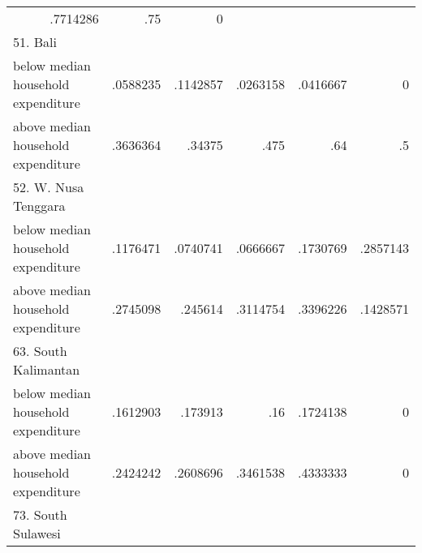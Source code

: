 \begin{table}[!h]
\begin{tabular}{llllll}
  \multicolumn{1}{r}{.7714286} &
  \multicolumn{1}{r}{.75} &
  \multicolumn{1}{r}{0} \\
\multicolumn{1}{l}{51. Bali} &
  \multicolumn{1}{|r}{} &
  \multicolumn{1}{r}{} &
  \multicolumn{1}{r}{} &
  \multicolumn{1}{r}{} &
  \multicolumn{1}{r}{} \\
\multicolumn{1}{l}{\hspace{1em}below median household expenditure} &
  \multicolumn{1}{|r}{.0588235} &
  \multicolumn{1}{r}{.1142857} &
  \multicolumn{1}{r}{.0263158} &
  \multicolumn{1}{r}{.0416667} &
  \multicolumn{1}{r}{0} \\
\multicolumn{1}{l}{\hspace{1em}above median household expenditure} &
  \multicolumn{1}{|r}{.3636364} &
  \multicolumn{1}{r}{.34375} &
  \multicolumn{1}{r}{.475} &
  \multicolumn{1}{r}{.64} &
  \multicolumn{1}{r}{.5} \\
\multicolumn{1}{l}{52. W. Nusa Tenggara} &
  \multicolumn{1}{|r}{} &
  \multicolumn{1}{r}{} &
  \multicolumn{1}{r}{} &
  \multicolumn{1}{r}{} &
  \multicolumn{1}{r}{} \\
\multicolumn{1}{l}{\hspace{1em}below median household expenditure} &
  \multicolumn{1}{|r}{.1176471} &
  \multicolumn{1}{r}{.0740741} &
  \multicolumn{1}{r}{.0666667} &
  \multicolumn{1}{r}{.1730769} &
  \multicolumn{1}{r}{.2857143} \\
\multicolumn{1}{l}{\hspace{1em}above median household expenditure} &
  \multicolumn{1}{|r}{.2745098} &
  \multicolumn{1}{r}{.245614} &
  \multicolumn{1}{r}{.3114754} &
  \multicolumn{1}{r}{.3396226} &
  \multicolumn{1}{r}{.1428571} \\
\multicolumn{1}{l}{63. South Kalimantan} &
  \multicolumn{1}{|r}{} &
  \multicolumn{1}{r}{} &
  \multicolumn{1}{r}{} &
  \multicolumn{1}{r}{} &
  \multicolumn{1}{r}{} \\
\multicolumn{1}{l}{\hspace{1em}below median household expenditure} &
  \multicolumn{1}{|r}{.1612903} &
  \multicolumn{1}{r}{.173913} &
  \multicolumn{1}{r}{.16} &
  \multicolumn{1}{r}{.1724138} &
  \multicolumn{1}{r}{0} \\
\multicolumn{1}{l}{\hspace{1em}above median household expenditure} &
  \multicolumn{1}{|r}{.2424242} &
  \multicolumn{1}{r}{.2608696} &
  \multicolumn{1}{r}{.3461538} &
  \multicolumn{1}{r}{.4333333} &
  \multicolumn{1}{r}{0} \\
\multicolumn{1}{l}{73. South Sulawesi} &

\end{tabular}
\end{table}

